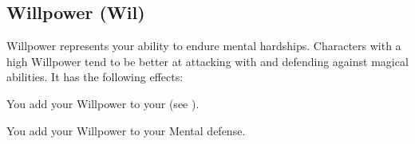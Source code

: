   \subsection{Willpower (Wil)}\label{Willpower}
    {
      Willpower represents your ability to endure mental hardships.
      Characters with a high Willpower tend to be better at attacking with and defending against magical abilities.
      It has the following effects:
      \begin{raggeditemize}
        \item You add your Willpower to your  (see ).
        \item You add your Willpower to your Mental defense.
      \end{raggeditemize}
    }
